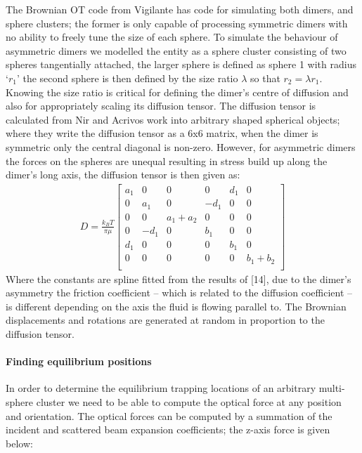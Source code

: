 \documentclass[preprint,  3p]{elsarticle}
\begin{document}
The Brownian OT code from Vigilante has code for simulating both dimers, and sphere clusters; the former is only capable of processing symmetric dimers with no ability to freely tune the size of each sphere. To simulate the behaviour of asymmetric dimers we modelled the entity as a sphere cluster consisting of two spheres tangentially attached, the larger sphere is defined as sphere 1 with radius ‘$r_1$’ the second sphere is then defined by the size ratio $\lambda$ so that $r_2 = \lambda r_1$.  Knowing the size ratio is critical for defining the dimer’s centre of diffusion and also for appropriately scaling its diffusion tensor. The diffusion tensor is calculated from Nir and Acrivos \cite{Nir_1973} work into arbitrary shaped spherical objects; where they write the diffusion tensor as a 6x6 matrix, when the dimer is symmetric only the central diagonal is non-zero. However, for asymmetric dimers the forces on the spheres are unequal resulting in stress build up along the dimer’s long axis, the diffusion tensor is then given as:
\begin{align}
	\label{eq:diffusion}
	D=\frac{k_BT}{\pi\mu}\left[
	\begin{matrix}
		a_1 & 0 & 0 & 0 & d_1 & 0\\
		0 & a_1 & 0 &-d_1 & 0 & 0\\
		0 & 0 & a_1+a_2 & 0 & 0 & 0\\
		0 & -d_1 & 0 & b_1 & 0 & 0\\
		d_1 & 0 & 0 & 0 & b_1 & 0\\
		0 & 0 & 0 & 0 & 0 & b_1+b_2\\
	\end{matrix}\right]
\end{align}
Where the constants are spline fitted from the results of [14], due to the dimer’s asymmetry the friction coefficient – which is related to the diffusion coefficient – is different depending on the axis the fluid is flowing parallel to. The Brownian displacements and rotations are generated at random in proportion to the diffusion tensor. 
\paragraph{Finding equilibrium positions}
In order to determine the equilibrium trapping locations of an arbitrary multi-sphere cluster we need to be able to compute the optical force at any position and orientation. The optical forces can be computed by a summation of the incident and scattered beam expansion coefficients; the z-axis force is given below:
\end{document}
